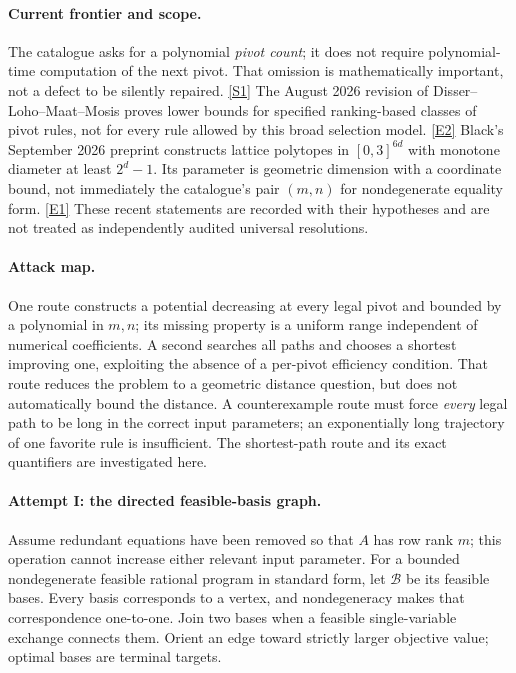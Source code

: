 \documentclass[11pt,a4paper]{article}
\newcommand{\sref}[2]{\hyperlink{source:#1:#2}{[S#2]}}
\newcommand{\eref}[2]{\hyperlink{extra:#1:#2}{[E#2]}}
\numberwithin{equation}{section}
\begin{document}
\paragraph{Current frontier and scope.}
The catalogue asks for a polynomial \emph{pivot count}; it does not
require polynomial-time computation of the next pivot.  That omission
is mathematically important, not a defect to be silently repaired.
\sref{30006742}{1}  The August 2026 revision of Disser--Loho--Maat--Mosis
proves lower bounds for specified ranking-based classes of pivot rules,
not for every rule allowed by this broad selection model.
\eref{30006742}{2}  Black's September 2026 preprint constructs lattice
polytopes in $[0,3]^{6d}$ with monotone diameter at least $2^d-1$.
Its parameter is geometric dimension with a coordinate bound, not
immediately the catalogue's pair $(m,n)$ for nondegenerate equality
form. \eref{30006742}{1}  These recent statements are recorded with their
hypotheses and are not treated as independently audited universal
resolutions.

\paragraph{Attack map.}
One route constructs a potential decreasing at every legal pivot and
bounded by a polynomial in $m,n$; its missing property is a uniform
range independent of numerical coefficients.  A second searches all
paths and chooses a shortest improving one, exploiting the absence
of a per-pivot efficiency condition.  That route reduces the problem
to a geometric distance question, but does not automatically bound the
distance.  A counterexample route must force \emph{every} legal path
to be long in the correct input parameters; an exponentially long
trajectory of one favorite rule is insufficient.  The shortest-path
route and its exact quantifiers are investigated here.

\paragraph{Attempt I: the directed feasible-basis graph.}
Assume redundant equations have been removed so that $A$ has row rank
$m$; this operation cannot increase either relevant input parameter.
For a bounded nondegenerate feasible rational program in standard form,
let $\mathcal B$ be its feasible bases.  Every basis corresponds to a
vertex, and nondegeneracy makes that correspondence one-to-one.  Join
two bases when a feasible single-variable exchange connects them.
Orient an edge toward strictly larger objective value; optimal bases
are terminal targets.
\end{document}
